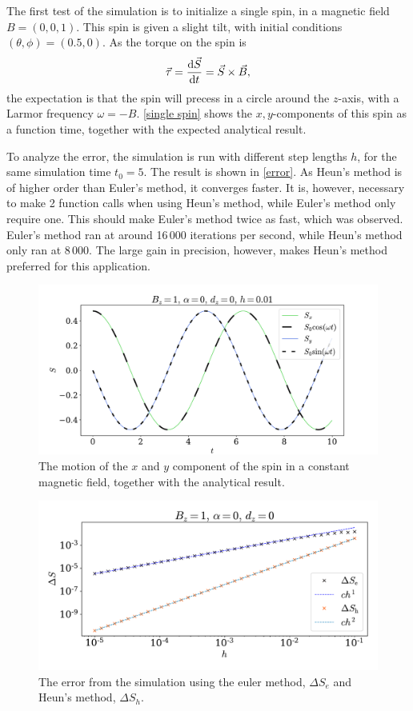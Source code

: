 \documentclass{article}
\begin{document}
    The first test of the simulation is to initialize a single spin, in a magnetic field $B = (0, 0, 1)$.
    This spin is given a slight tilt, with initial conditions $(\theta, \phi) = (0.5, 0)$.
    As the torque on the spin is 
    \begin{equation*}
        \vec \tau = \dv{\vec S}{t} = \vec{S} \times \vec{B},
    \end{equation*}
    the expectation is that the spin will precess in a circle around the $z$-axis, with a Larmor frequency $\omega = -B$.
    \autoref{single spin} shows the $x,y$-components of this spin as a function time, together with the expected analytical result.

    To analyze the error, the simulation is run with different step lengths $h$, for the same simulation time $t_0 = 5$.
    The result is shown in \autoref{error}.
    As Heun's method is of higher order than Euler's method, it converges faster.
    It is, however, necessary to make 2 function calls when using Heun's method, while Euler's method only require one.
    This should make Euler's method twice as fast, which was observed.
    Euler's method ran at around 16\,000 iterations per second, while Heun's method only ran at 8\,000.
    The large gain in precision, however, makes Heun's method preferred for this application.

    \begin{figure}[H]
        \centering
            \includegraphics[width=.7\textwidth]{../plots/single.pdf}
            \caption{The motion of the $x$ and $y$ component of the spin in a constant magnetic field, together with the analytical result.}
            \label{single spin}
    \end{figure}

    \begin{figure}[H]
        \centering
        \includegraphics[width=.7\textwidth]{../plots/err.pdf}
        \caption{The error from the simulation using the euler method, $\Delta S_e$ and Heun's method, $\Delta S_h$.}
        \label{error}
    \end{figure}
\end{document}
